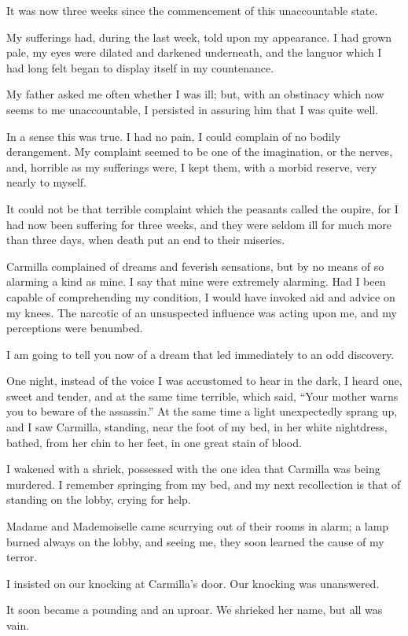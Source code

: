 \documentclass[11pt,twoside,makeidx,hidelinks,]{memoir}
\begin{document}
It was now three weeks since the commencement of this unaccountable
state.

My sufferings had, during the last week, told upon my appearance. I had
grown pale, my eyes were dilated and darkened underneath, and the
languor which I had long felt began to display itself in my countenance.

My father asked me often whether I was ill; but, with an obstinacy which
now seems to me unaccountable, I persisted in assuring him that I was
quite well.

In a sense this was true. I had no pain, I could complain of no bodily
derangement. My complaint seemed to be one of the imagination, or the
nerves, and, horrible as my sufferings were, I kept them, with a morbid
reserve, very nearly to myself.

It could not be that terrible complaint which the peasants called the
oupire, for I had now been suffering for three weeks, and they were
seldom ill for much more than three days, when death put an end to
their miseries.

Carmilla complained of dreams and feverish sensations, but by no means
of so alarming a kind as mine. I say that mine were extremely alarming.
Had I been capable of comprehending my condition, I would have invoked
aid and advice on my knees. The narcotic of an unsuspected influence was
acting upon me, and my perceptions were benumbed.

I am going to tell you now of a dream that led immediately to an odd
discovery.

One night, instead of the voice I was accustomed to hear in the dark, I
heard one, sweet and tender, and at the same time terrible, which said,
``Your mother warns you to beware of the assassin.'' At the same time a
light unexpectedly sprang up, and I saw Carmilla, standing, near the
foot of my bed, in her white nightdress, bathed, from her chin to her
feet, in one great stain of blood.

I wakened with a shriek, possessed with the one idea that Carmilla was
being murdered. I remember springing from my bed, and my next
recollection is that of standing on the lobby, crying for help.

Madame and Mademoiselle came scurrying out of their rooms in alarm; a
lamp burned always on the lobby, and seeing me, they soon learned the
cause of my terror.

I insisted on our knocking at Carmilla's door. Our knocking was
unanswered.

It soon became a pounding and an uproar. We shrieked her name, but all
was vain.
\end{document}
